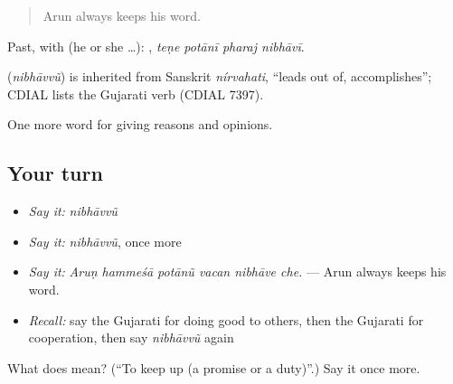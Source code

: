 \begin{quote}
Arun always keeps his word.
\end{quote}

Past, with  (he or she …):    , \emph{teṇe potānī pharaj nibhāvī}.

\begin{cousinweb}
\textbf{} (\emph{nibhāvvũ}) is inherited from Sanskrit \emph{nírvahati}, \textquotedblleft{}leads out of, accomplishes\textquotedblright{}; CDIAL lists the Gujarati verb (CDIAL 7397).
\end{cousinweb}

\begin{grammarlens}[title={What you've built}]
One more word for giving reasons and opinions.
\end{grammarlens}

\subsection*{Your turn}
\begin{itemize}
\raggedright
  \item \emph{Say it:} \emph{nibhāvvũ}
  \item \emph{Say it:} \emph{nibhāvvũ}, once more
  \item \emph{Say it:} \emph{Aruṇ hammeśā potānũ vacan nibhāve che.} — Arun always keeps his word.
  \item \emph{Recall:} say the Gujarati for doing good to others, then the Gujarati for cooperation, then say \emph{nibhāvvũ} again
\end{itemize}

\begin{tcolorbox}[breakable,colback=teal!4,colframe=teal!35!black,title={Before you move on}]
What does  mean? (\textquotedblleft{}To keep up (a promise or a duty)\textquotedblright{}.) Say it once more.
\end{tcolorbox}

